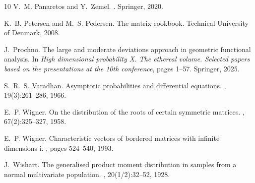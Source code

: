 \documentclass[11pt,a4paper,twoside]{article}
\theoremstyle{definition}
\begin{document}
\begin{thebibliography}{10}
V.~M. Panaretos and Y.~Zemel.
.
\newblock Springer, 2020.

K.~B. Petersen and M.~S. Pedersen.
\newblock The matrix cookbook.
\newblock Technical University of Denmark, 2008.

J.~Prochno.
\newblock The large and moderate deviations approach in geometric functional analysis.
\newblock In {\em High dimensional probability X. The ethereal volume. Selected papers based on the presentations at the 10th conference}, pages 1--57. Springer, 2025.

S.~R.~S. Varadhan.
\newblock Asymptotic probabilities and differential equations.
, 19(3):261--286, 1966.

E.~P. Wigner.
\newblock On the distribution of the roots of certain symmetric matrices.
, 67(2):325--327, 1958.

E.~P. Wigner.
\newblock Characteristic vectors of bordered matrices with infinite dimensions i.
, pages 524--540, 1993.

J.~Wishart.
\newblock The generalised product moment distribution in samples from a normal multivariate population.
, 20(1/2):32--52, 1928.

\end{thebibliography}
\end{document}
